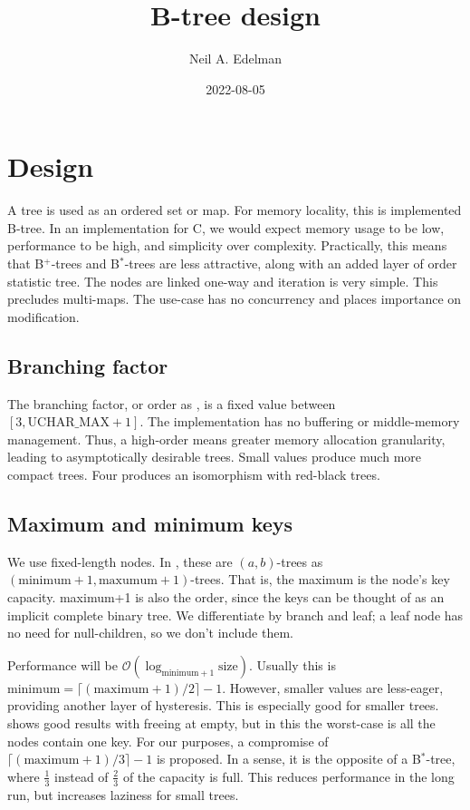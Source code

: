 \documentclass[12pt]{article}
\author{Neil A. Edelman}
\title{B-tree design}
\date{2022-08-05}
\begin{document}
\maketitle


\section{Design}

A tree is used as an ordered set or map. For memory locality, this is implemented B-tree\cite{bayer1972organization}. In an implementation for C, we would expect memory usage to be low, performance to be high, and simplicity over complexity. Practically, this means that B$^+$-trees and B$^*$-trees are less attractive, along with an added layer of order statistic tree. The nodes are linked one-way and iteration is very simple. This precludes multi-maps. The use-case has no concurrency and places importance on modification.

\subsection{Branching factor}

The branching factor, or order as \cite{knuth1997sorting}, is a fixed value between $[3,\text{UCHAR\_MAX}+1]$. The implementation has no buffering or middle-memory management. Thus, a high-order means greater memory allocation granularity, leading to asymptotically desirable trees. Small values produce much more compact trees. Four produces an isomorphism with red-black trees.

\subsection{Maximum and minimum keys}

We use fixed-length nodes. In \cite{goodrich2011data}, these are $(a,b)$-trees as $(\text{minimum}+1, \text{maxumum}+1)$\nobreakdash-trees. That is, the maximum is the node's key capacity. maximum+1 is also the order, since the keys can be thought of as an implicit complete binary tree. We differentiate by branch and leaf; a leaf node has no need for null-children, so we don't include them.

Performance will be
$\mathcal{O}(\log_{\text{minimum}+1} \text{size})$. Usually this is $\text{minimum} = \lceil (\text{maximum}+1)/2\rceil-1$. However,
 smaller values are less-eager, providing another layer of hysteresis. This is especially good for smaller trees. \cite{johnson1993b} shows good results with freeing at empty, but in this the worst-case is all the nodes contain one key.
For our purposes, a compromise of $\lceil(\text{maximum}+1)/3\rceil-1$ is proposed. In a sense, it is the opposite of a B$^*$-tree, where $\frac{1}{3}$ instead of $\frac{2}{3}$ of the capacity is full. This reduces performance in the long run, but increases laziness for small trees.
\end{document}
